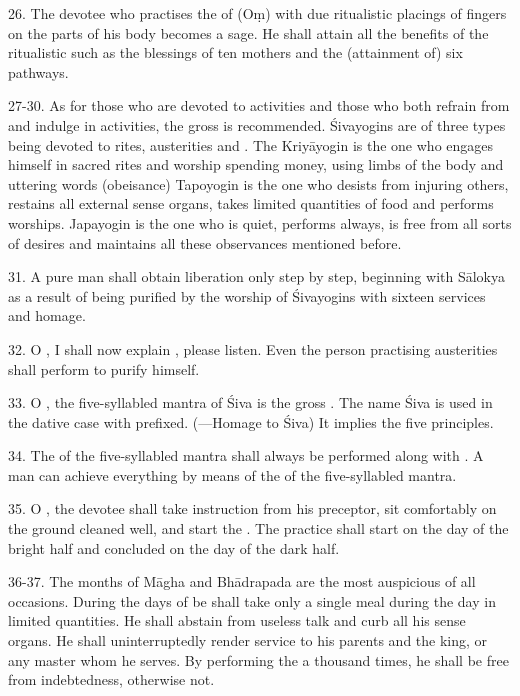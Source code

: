 26. The devotee who practises the  of  (Oṃ) with due
ritualistic placings of fingers on the parts of his body becomes a sage. He
shall attain all the benefits of the ritualistic  such as
the blessings of ten mothers and the (attainment of) six pathways.

27-30. As for those who are devoted to activities and those who both refrain
from and indulge in activities, the gross  is recommended.
Śivayogins are of three types being devoted to rites, austerities and .
The Kriyāyogin is the one who engages himself in sacred rites and worship
spending money, using limbs of the body and uttering words 
(obeisance) \etc Tapoyogin is the one who desists from injuring others, restains
all external sense organs, takes limited quantities of food and performs
worships. Japayogin is the one who is quiet, performs  always, is free
from all sorts of desires and maintains all these observances mentioned before.

31. A pure man shall obtain liberation only step by step, beginning with Sālokya
as a result of being purified by the worship of Śivayogins with sixteen services
and homage.

32. O , I shall now explain , please listen. Even
the person practising austerities shall perform  to purify himself.

33. O , the five-syllabled mantra of Śiva is the gross .
The name Śiva is used in the dative case with  prefixed. (—Homage to Śiva) It implies the five principles.

34. The  of the five-syllabled mantra shall always be performed along
with . A man can achieve everything by means of the  of
the five-syllabled mantra.

35. O , the devotee shall take instruction from his preceptor,
sit comfortably on the ground cleaned well, and start the .
The practice shall start on the  day of the bright half and
concluded on the  day of the dark half.

36-37. The months of Māgha and Bhādrapada are the most auspicious of all
occasions. During the days of  be shall take only a single meal during
the day in limited quantities. He shall abstain from useless talk and curb all
his sense organs. He shall uninterruptedly render service to his parents and
the king, or any master whom he serves. By performing the  a thousand
times, he shall be free from indebtedness, otherwise not.

